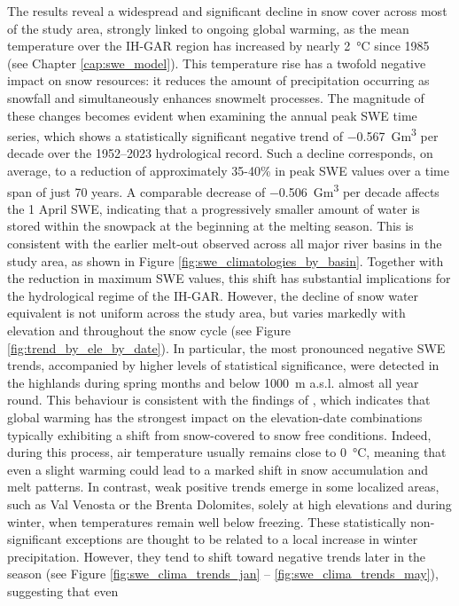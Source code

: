 The results reveal a widespread and significant decline in snow cover across most of the study area, strongly linked to ongoing global warming, as 
the mean temperature over the IH-GAR region has increased by nearly \SI{2}{\degreeCelsius} since 1985 (see Chapter \ref{cap:swe_model}). This 
temperature rise has a twofold negative impact on snow resources: it reduces the amount of precipitation occurring as snowfall and simultaneously
enhances snowmelt processes. The magnitude of these changes becomes evident when examining the annual peak SWE time series, which shows 
a statistically significant negative trend of \SI{-0.567}{\giga\meter\cubed} per decade over the 1952--2023 hydrological record. Such a decline corresponds, 
on average, to a reduction of approximately 35-40\% in peak SWE values over a time span of just 70 years. A comparable decrease of 
\SI{-0.506}{\giga\meter\cubed} per decade affects the 1 April SWE, indicating that a progressively smaller amount of water is stored within the 
snowpack at the beginning at the melting season. This is consistent with the earlier melt-out observed across all major river basins in the study area, 
as shown in Figure \ref{fig:swe_climatologies_by_basin}. Together with the reduction in maximum SWE values, this shift has substantial implications 
for the hydrological regime of the IH-GAR. However, the decline of snow water equivalent is not uniform across the study area, but varies markedly with 
elevation and throughout the snow cycle (see Figure \ref{fig:trend_by_ele_by_date}). In particular, the most pronounced negative SWE trends, accompanied 
by higher levels of statistical significance, were detected in the highlands during spring months and below \SI{1000}{\meter} a.s.l. almost all year round. 
This behaviour is consistent with the findings of \cite{Matiu_HS}, which indicates that global warming has the strongest impact on the elevation-date 
combinations typically exhibiting a shift from snow-covered to snow free conditions. Indeed, during this process, air temperature usually remains close to 
\SI{0}{\degreeCelsius}, meaning that even a slight warming could lead to a marked shift in snow accumulation and melt patterns. In contrast, weak positive 
trends emerge in some localized areas, such as Val Venosta or the Brenta Dolomites, solely at high elevations and during winter, when temperatures remain 
well below freezing. These statistically non-significant exceptions are thought to be related to a local increase in winter precipitation. However, they 
tend to shift toward negative trends later in the season (see Figure \ref{fig:swe_clima_trends_jan} -- \ref{fig:swe_clima_trends_may}), suggesting that even 
